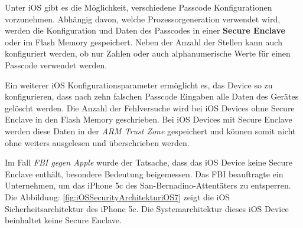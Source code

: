  Unter iOS gibt es die Möglichkeit, verschiedene Passcode Konfigurationen vorzunehmen. Abhängig davon, welche Prozessorgeneration verwendet wird, werden die Konfiguration und Daten des Passcodes in einer \textbf{Secure Enclave} oder im Flash Memory gespeichert. Neben der Anzahl der Stellen kann auch konfiguriert werden, ob nur Zahlen oder auch alphanumerische Werte für einen Passcode verwendet werden.\par 
 Ein weiterer iOS Konfigurationsparameter ermöglicht es, das Device so zu konfigurieren, dass nach zehn falschen Passcode Eingaben alle Daten des Gerätes gelöscht werden. Die Anzahl der Fehlversuche wird bei iOS Devices ohne Secure Enclave in den Flash Memory geschrieben. Bei iOS Devices mit Secure Enclave werden diese Daten in der \textit{\glqq ARM Trust Zone\grqq{}} gespeichert und können somit nicht ohne weiters ausgelesen und überschrieben werden. 
 
 
 Im Fall \textit{\glqq FBI gegen Apple\grqq{}} wurde der Tatsache, dass das iOS Device keine Secure Enclave enthält, besondere Bedeutung beigemessen. Das FBI beauftragte ein Unternehmen, um das iPhone 5c des San-Bernadino-Attentäters zu entsperren. Die Abbildung: \ref{fig:iOSSecurityArchitekturiOS7} zeigt die iOS Sicherheitsarchitektur des iPhone 5c. Die Systemarchitektur dieses iOS Device beinhaltet keine Secure Enclave. \par 
\newpage
